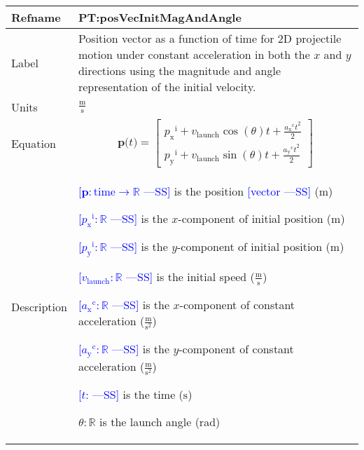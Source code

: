 \documentclass[12pt]{article}
\newcommand{\authornote}[3]{\textcolor{#1}{[#3 ---#2]}}
\newcommand{\authornote}[3]{}
\newcommand{\wss}[1]{\authornote{blue}{SS}{#1}}
\begin{document}
\noindent
\begin{minipage}{\textwidth}
\begin{tabular}{>{\raggedright}p{}>{\raggedright\arraybackslash}p{}}
\toprule \textbf{Refname} & \textbf{PT:posVecInitMagAndAngle}
\label{PT:posVecInitMagAndAngle}
\\ \midrule
Label & Position vector as a function of time for 2D projectile motion under
constant acceleration in both the $x$ and $y$ directions using the magnitude and
angle representation of the initial velocity.
        
\\ \midrule
Units & $\frac{\text{m}}{\text{s}}$
        
\\ \midrule
Equation & \begin{displaymath}
           \symbf{p}\text{(}t\text{)}=\begin{bmatrix}
                                      {{p_{\text{x}}}^{\text{i}}}+{v}_{\text{launch}} \cos(\theta) t +\frac{{{a_{\text{x}}}^{\text{c}}} t^{2}}{2}\\
                                      {{p_{\text{y}}}^{\text{i}}}+{v}_{\text{launch}} \sin(\theta) t +\frac{{{a_{\text{y}}}^{\text{c}}} t^{2}}{2}
                                      \end{bmatrix}
           \end{displaymath}
\\ \midrule
Description & \begin{symbDescription}
              \item{\wss{$\symbf{p}: \text{time} \rightarrow \mathbb{R}$} is the position \wss{vector} (${\text{m}}$)}
              \item{\wss{${{p_{\text{x}}}^{\text{i}}}: \mathbb{R}$} is the $x$-component of initial position (${\text{m}}$)}
              \item{\wss{${{p_{\text{y}}}^{\text{i}}}: \mathbb{R}$} is the $y$-component of initial position (${\text{m}}$)}
              \item{\wss{${{v}_{\text{launch}}}: \mathbb{R}$} is the initial speed ($\frac{\text{m}}{\text{s}}$)}
              \item{\wss{${{a_{\text{x}}}^{\text{c}}}: \mathbb{R}$} is the $x$-component of constant acceleration ($\frac{\text{m}}{\text{s}^{2}}$)}
              \item{\wss{${{a_{\text{y}}}^{\text{c}}}: \mathbb{R}$} is the $y$-component of constant acceleration ($\frac{\text{m}}{\text{s}^{2}}$)}
              \item{\wss{$t$: \text{time}} is the time (${\text{s}}$)}
              \item $\theta: \mathbb{R}$ is the launch angle (rad)
              \end{symbDescription}


\end{tabular}
\end{minipage}
\end{document}
